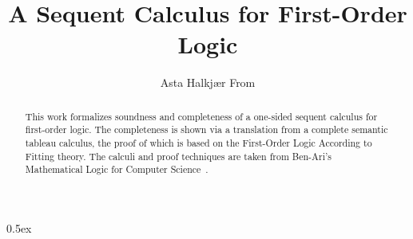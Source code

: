 \documentclass[11pt,a4paper]{article}
\title{A Sequent Calculus for First-Order Logic}
\author{Asta Halkjær From}
\begin{document}
\maketitle

\begin{abstract}
  This work formalizes soundness and completeness of a one-sided sequent calculus for first-order logic.
  The completeness is shown via a translation from a complete semantic tableau calculus, the proof of which is based on the First-Order Logic According to Fitting theory.
  The calculi and proof techniques are taken from Ben-Ari's Mathematical Logic for Computer Science~\cite{BenAri2012}.
\end{abstract}

\tableofcontents
\newpage

\parindent 0pt\parskip 0.5ex





\end{document}
